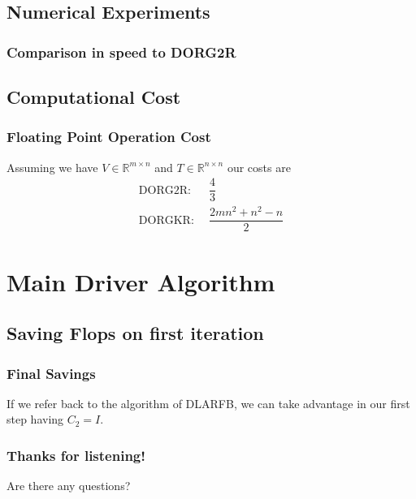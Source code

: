 \documentclass[12pt]{beamer}
\newcommand{\R}{\mathbb{R}}
\begin{document}
    \subsection{Numerical Experiments}
    \begin{frame}
        \frametitle{Comparison in speed to DORG2R}
    \end{frame}
    \subsection{Computational Cost}
    \begin{frame}
        \frametitle{Floating Point Operation Cost}
        Assuming we have $V\in\R^{m\times n}$ and $T\in\R^{n\times n}$ our costs are 
        \begin{align*}
            \text{DORG2R: }&\, \dfrac{4}{3}\\
            \text{DORGKR: }&\, \dfrac{2mn^2 + n^2 - n}{2}
        \end{align*}
    \end{frame}
    \section{Main Driver Algorithm}
    \subsection{Saving Flops on first iteration}
    \begin{frame}
        \frametitle{Final Savings}
        If we refer back to the algorithm of DLARFB, we can take advantage in our first step having $C_2=I$.
    \end{frame}
    \begin{frame}
        \frametitle{Thanks for listening!}
        Are there any questions?
    \end{frame}
\end{document}
